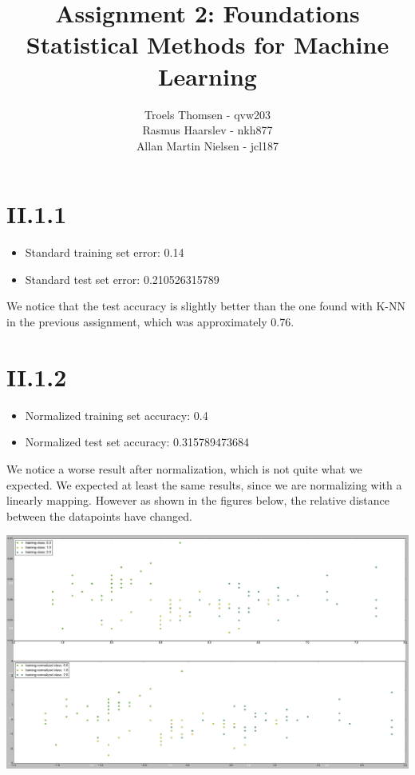 \documentclass[12pt, a4paper]{article}
\title{Assignment 2: Foundations\\Statistical Methods for Machine Learning}
\author{Troels Thomsen - qvw203\\Rasmus Haarslev - nkh877\\Allan Martin Nielsen - jcl187}
\begin{document}
\pagestyle{empty}
\maketitle
{}
\newpage

\tableofcontents
\newpage

\pagestyle{fancy}

\section{II.1.1}
\begin{itemize}
	\item Standard training set error: 0.14
	\item Standard test set error: 0.210526315789
\end{itemize}

We notice that the test accuracy is slightly better than the one found with K-NN in the previous assignment, which was approximately 0.76.

\section{II.1.2}
\begin{itemize}
	\item Normalized training set accuracy: 0.4
	\item Normalized test set accuracy: 0.315789473684
\end{itemize}

We notice a worse result after normalization, which is not quite what we expected. We expected at least the same results, since we are normalizing with a linearly mapping.
However as shown in the figures below, the relative distance between the datapoints have changed.

\includegraphics[scale=0.25]{lda_normalization.png}
\end{document}
